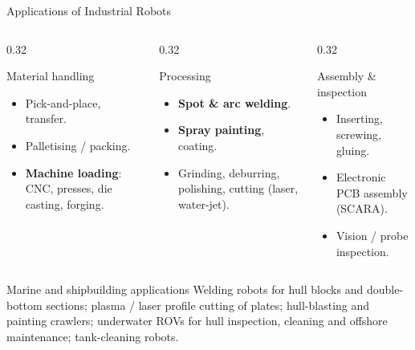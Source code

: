 \documentclass[aspectratio=169]{beamer}
\begin{document}
	\begin{frame}{Applications of Industrial Robots}
		\begin{columns}[T]
			\begin{column}{0.32\textwidth}
				\begin{block}{Material handling}
					\begin{itemize}\small
						\item Pick-and-place, transfer.
						\item Palletising / packing.
						\item \textbf{Machine loading}: CNC, presses, die casting, forging.
					\end{itemize}
				\end{block}
			\end{column}
			\begin{column}{0.32\textwidth}
				\begin{block}{Processing}
					\begin{itemize}\small
						\item \textbf{Spot \& arc welding}.
						\item \textbf{Spray painting}, coating.
						\item Grinding, deburring, polishing, cutting (laser, water-jet).
					\end{itemize}
				\end{block}
			\end{column}
			\begin{column}{0.32\textwidth}
				\begin{block}{Assembly \& inspection}
					\begin{itemize}\small
						\item Inserting, screwing, gluing.
						\item Electronic PCB assembly (SCARA).
						\item Vision / probe inspection.
					\end{itemize}
				\end{block}
			\end{column}
		\end{columns}
		\vspace{0.3cm}
		\begin{block}{Marine and shipbuilding applications}
			\small Welding robots for hull blocks and double-bottom sections; plasma / laser profile cutting of plates; hull-blasting and painting crawlers; underwater ROVs for hull inspection, cleaning and offshore maintenance; tank-cleaning robots.
		\end{block}
	\end{frame}
\end{document}
